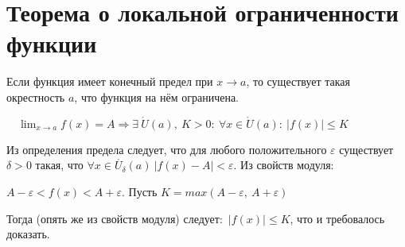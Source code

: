 \section{Теорема о локальной ограниченности функции}
\begin{theorem}
Если функция имеет конечный предел при $x \to a$, то существует такая окрестность $a$, что функция на нём ограничена.
\begin{center}$\displaystyle \quad \lim_{x \to a} f(x) = A \Rightarrow \exists\  \mathring{U}(a),\  K > 0:\ \forall x \in \mathring{U}(a):\ |f(x)| \leq K$\end{center}
\end{theorem}
Из определения предела следует, что для любого положительного $\varepsilon$ существует $\delta > 0$ такая, что $\forall x \in \mathring{U_{\delta}}(a)\ |f(x) - A| < \varepsilon$. Из свойств модуля:
\begin{center}$A - \varepsilon < f(x) < A + \varepsilon$. Пусть $K = max(A - \varepsilon,\ A + \varepsilon)$\end{center} 
Тогда (опять же из свойств модуля) следует:\ $|f(x)| \leq K$, что и требовалось доказать.